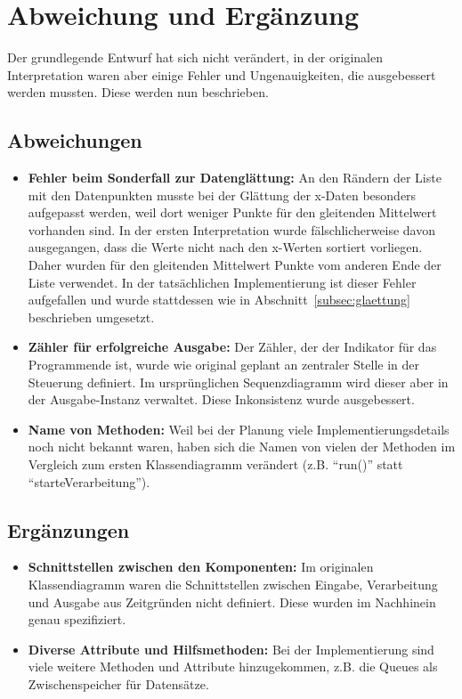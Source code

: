 \chapter{Abweichung und Ergänzung}\label{ch:abweichung-und-ergaenzung}
Der grundlegende Entwurf hat sich nicht verändert, in der originalen Interpretation waren aber einige Fehler und Ungenauigkeiten, die ausgebessert werden mussten.
Diese werden nun beschrieben.

\section{Abweichungen}\label{sec:abweich}

\begin{itemize}[noitemsep]
    \item \textbf{Fehler beim Sonderfall zur Datenglättung:} An den Rändern der Liste mit den Datenpunkten musste bei der Glättung der x-Daten besonders aufgepasst werden, weil dort weniger Punkte für den gleitenden Mittelwert vorhanden sind.
    In der ersten Interpretation wurde fälschlicherweise davon ausgegangen, dass die Werte nicht nach den x-Werten sortiert vorliegen.
    Daher wurden für den gleitenden Mittelwert Punkte vom anderen Ende der Liste verwendet.
    In der tatsächlichen Implementierung ist dieser Fehler aufgefallen und wurde stattdessen wie in Abschnitt~\ref{subsec:glaettung} beschrieben umgesetzt.
    \item \textbf{Zähler für erfolgreiche Ausgabe:} Der Zähler, der der Indikator für das Programmende ist, wurde wie original geplant an zentraler Stelle in der Steuerung definiert.
    Im ursprünglichen Sequenzdiagramm wird dieser aber in der Ausgabe-Instanz verwaltet.
    Diese Inkonsistenz wurde ausgebessert.
    \item \textbf{Name von Methoden:} Weil bei der Planung viele Implementierungsdetails noch nicht bekannt waren, haben sich die Namen von vielen der Methoden im Vergleich zum ersten Klassendiagramm verändert (z.B. \enquote{run()} statt \enquote{starteVerarbeitung}).
\end{itemize}

\section{Ergänzungen}\label{sec:erg}

\begin{itemize}
    \item \textbf{Schnittstellen zwischen den Komponenten:} Im originalen Klassendiagramm waren die Schnittstellen zwischen Eingabe, Verarbeitung und Ausgabe aus Zeitgründen nicht definiert.
    Diese wurden im Nachhinein genau spezifiziert.
    \item \textbf{Diverse Attribute und Hilfsmethoden:} Bei der Implementierung sind viele weitere Methoden und Attribute hinzugekommen, z.B. die Queues als Zwischenspeicher für Datensätze.
\end{itemize}
